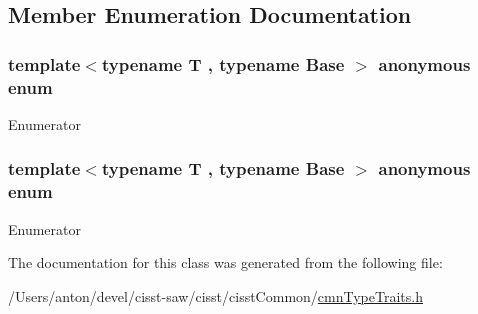 \subsection{Member Enumeration Documentation}
\hypertarget{classcmn_is_derived_from_a65a36468e89d50a80c11e25cf58c8e75}{}\subsubsection[{anonymous enum}]{\setlength{\rightskip}{0pt plus 5cm}template$<$typename T , typename Base $>$ anonymous enum}\label{classcmn_is_derived_from_a65a36468e89d50a80c11e25cf58c8e75}
\begin{Desc}
\item[Enumerator]\par
\begin{description}
\item[{\em 
\hypertarget{classcmn_is_derived_from_a65a36468e89d50a80c11e25cf58c8e75af3a2348d584176f8c4bfae532328995c}{}I\+S\+\_\+\+D\+E\+R\+I\+V\+E\+D\label{classcmn_is_derived_from_a65a36468e89d50a80c11e25cf58c8e75af3a2348d584176f8c4bfae532328995c}
}]\end{description}
\end{Desc}
\hypertarget{classcmn_is_derived_from_a8c4e19bd9b70a51bfc0d6bd0aea19334}{}\subsubsection[{anonymous enum}]{\setlength{\rightskip}{0pt plus 5cm}template$<$typename T , typename Base $>$ anonymous enum}\label{classcmn_is_derived_from_a8c4e19bd9b70a51bfc0d6bd0aea19334}
\begin{Desc}
\item[Enumerator]\par
\begin{description}
\item[{\em 
\hypertarget{classcmn_is_derived_from_a8c4e19bd9b70a51bfc0d6bd0aea19334a533e6436963bc9d801b91be0244d5050}{}I\+S\+\_\+\+N\+O\+T\+\_\+\+D\+E\+R\+I\+V\+E\+D\label{classcmn_is_derived_from_a8c4e19bd9b70a51bfc0d6bd0aea19334a533e6436963bc9d801b91be0244d5050}
}]\end{description}
\end{Desc}


The documentation for this class was generated from the following file\+:\begin{DoxyCompactItemize}
\item 
/\+Users/anton/devel/cisst-\/saw/cisst/cisst\+Common/\hyperlink{cmn_type_traits_8h}{cmn\+Type\+Traits.\+h}\end{DoxyCompactItemize}

